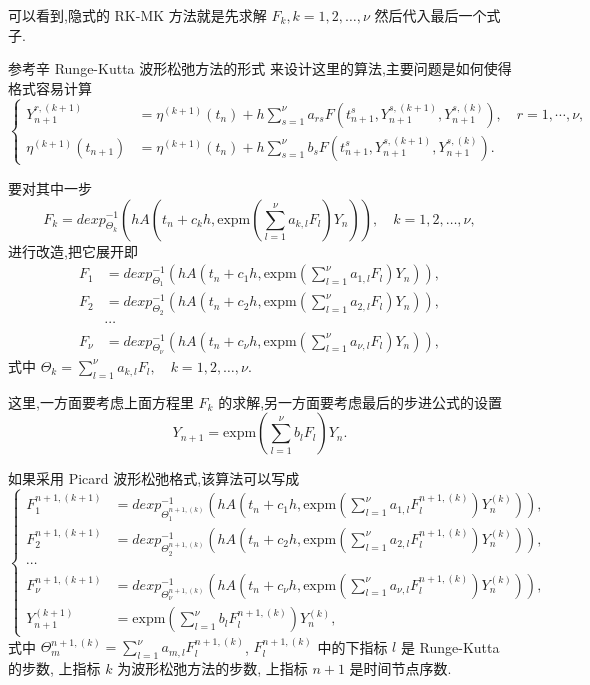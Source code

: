 可以看到,隐式的 RK-MK 方法就是先求解 $F_k,k=1,2,\ldots,\nu$ 然后代入最后一个式子.

参考辛 Runge-Kutta 波形松弛方法的形式 \cite{bellen1993use} 来设计这里的算法,主要问题是如何使得格式容易计算
\begin{equation*}
  \left\lbrace
    \begin{aligned}
      Y_{n+1}^{r,(k+1)}&=\eta^{(k+1)}(t_{n})+h\sum_{s=1}^{\nu}a_{rs}F(t_{n+1}^{s},Y_{n+1}^{s,(k+1)},Y_{n+1}^{s,(k)}),\quad r=1,\cdots, \nu, \\
      \eta^{(k+1)}(t_{n+1})&=\eta^{(k+1)}(t_{n})+h\sum_{s=1}^{\nu}b_{s}F(t_{n+1}^{s},Y_{n+1}^{s,(k+1)},Y_{n+1}^{s,(k)}).
    \end{aligned}
  \right.
\end{equation*}

要对其中一步
\begin{equation*}
	F_k=dexp_{\Theta_k}^{-1}(hA(t_n+c_kh,\mbox{expm}(\sum_{l=1}^{\nu}a_{k,l}F_l)Y_n)),\quad k=1,2,\ldots,\nu,
\end{equation*}
进行改造,把它展开即
\begin{equation*}
	\begin{aligned}
		F_1&=dexp_{\Theta_1}^{-1}(hA(t_n+c_1h,\mbox{expm}(\sum_{l=1}^{\nu}a_{1,l}F_l)Y_n)),\\
		F_2&=dexp_{\Theta_2}^{-1}(hA(t_n+c_2h,\mbox{expm}(\sum_{l=1}^{\nu}a_{2,l}F_l)Y_n)),\\
		&\cdots \\
		F_{\nu}&=dexp_{\Theta_{\nu}}^{-1}(hA(t_n+c_{\nu}h,\mbox{expm}(\sum_{l=1}^{\nu}a_{\nu,l}F_l)Y_n)),
	\end{aligned}
\end{equation*}
式中 $\Theta_k=\sum_{l=1}^{\nu}a_{k,l}F_l,\quad k=1,2,\ldots,\nu$.

这里,一方面要考虑上面方程里 $F_k$ 的求解,另一方面要考虑最后的步进公式的设置
\begin{equation*}
	Y_{n+1}=\mbox{expm}(\sum_{l=1}^{\nu}b_lF_l)Y_n.
\end{equation*}

如果采用 Picard 波形松弛格式,该算法可以写成
\begin{equation*}
	\left\lbrace\begin{aligned}
		F_1^{n+1,(k+1)}&=dexp_{\Theta_1^{n+1,(k)}}^{-1}(hA(t_n+c_1h,\mbox{expm}(\sum_{l=1}^{\nu}a_{1,l}F_l^{n+1,(k)})Y_n^{(k)})),\\
		F_2^{n+1,(k+1)}&=dexp_{\Theta_2^{n+1,(k)}}^{-1}(hA(t_n+c_2h,\mbox{expm}(\sum_{l=1}^{\nu}a_{2,l}F_l^{n+1,(k)})Y_n^{(k)})),\\
		\cdots \\
		F_{\nu}^{n+1,(k+1)}&=dexp_{\Theta_{\nu}^{n+1,(k)}}^{-1}(hA(t_n+c_{\nu}h,\mbox{expm}(\sum_{l=1}^{\nu}a_{\nu,l}F_l^{n+1,(k)})Y_n^{(k)})),\\
		Y_{n+1}^{(k+1)}&=\mbox{expm}(\sum_{l=1}^{\nu}b_lF_l^{n+1,(k)})Y_n^{(k)},
	\end{aligned}\right.
\end{equation*}
式中 $\Theta_m^{n+1,(k)} = \sum_{l=1}^{\nu}a_{m,l}F_l^{n+1,(k)}$, $F_l^{n+1,(k)}$ 中的下指标 $l$ 是 Runge-Kutta 的步数, 上指标 $k$ 为波形松弛方法的步数, 上指标 $n+1$ 是时间节点序数.

